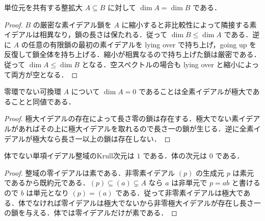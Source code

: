 \begin{prop}[整拡大における次元の保存]
単位元を共有する整拡大 $A\subseteq B$ に対して $\dim A=\dim B$ である．
\end{prop}
\begin{proof}
$B$ の厳密な素イデアル鎖を $A$ に縮小すると非比較性によって隣接する素イデアルは相異なり，鎖の長さは保たれる．従って $\dim B\le\dim A$ である．逆に $A$ の任意の有限鎖の最初の素イデアルを lying over で持ち上げ，going up を反復して鎖全体を持ち上げる．縮小が相異なるので持ち上げた鎖は厳密である．従って $\dim A\le\dim B$ となる．空スペクトルの場合も lying over と縮小によって両方が空となる．
\end{proof}
\begin{prop}[次元零の判定]
零環でない可換環 $A$ について $\dim A=0$ であることは全素イデアルが極大であることと同値である．
\end{prop}
\begin{proof}
極大イデアルの存在によって長さ零の鎖は存在する．極大でない素イデアルがあればその上に極大イデアルを取れるので長さ一の鎖が生じる．逆に全素イデアルが極大なら長さ一以上の鎖は存在しない．
\end{proof}
\begin{example}[単項イデアル整域の次元]
体でない単項イデアル整域のKrull次元は $1$ である．体の次元は $0$ である．
\end{example}
\begin{proof}
整域の零イデアルは素である．非零素イデアル $(p)$ の生成元 $p$ は素元であるから既約元である．$(p)\subseteq(a)\subsetneq A$ なら $a$ は非単元で $p=ab$ と書けるので $b$ は単元となり $(p)=(a)$ である．従って非零素イデアルは極大である．体でなければ零イデアルは極大でないから非零極大イデアルが存在し長さ一の鎖を与える．体では零イデアルだけが素である．
\end{proof}
